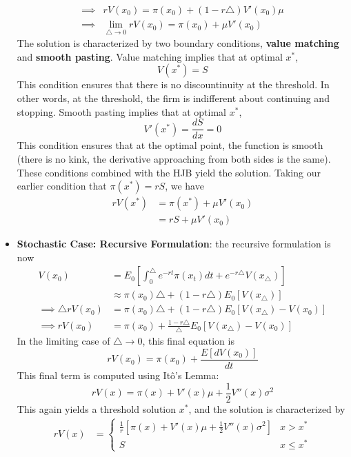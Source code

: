 \documentclass[12pt]{article}
\begin{document}
\begin{itemize}
\[\begin{split}
        \implies &rV(x_0) = \pi(x_0) + (1-r\triangle)V'(x_0)\mu \\
        \implies &\lim_{\triangle \to 0}rV(x_0) = \pi(x_0) + \mu V'(x_0)
    \end{split}\]
    The solution is characterized by two boundary conditions, \textbf{value matching} and \textbf{smooth pasting}. Value matching implies that at optimal $x^*$, 
    \[V(x^*) = S\]
    This condition ensures that there is no discountinuity at the threshold. In other words, at the threshold, the firm is indifferent about continuing and stopping. Smooth pasting implies that at optimal $x^*$,
    \[V'(x^*) = \frac{dS}{dx} = 0\]
    This condition ensures that at the optimal point, the function is smooth (there is no kink, the derivative approaching from both sides is the same). These conditions combined with the HJB yield the solution. Taking our earlier condition that $\pi(x^*) = rS$, we have
    \[\begin{split}
        rV(x^*) &= \pi(x^*) + \mu V'(x_0) \\
        &= rS + \mu V'(x_0)
    \end{split}\]
    \item \textbf{Stochastic Case: Recursive Formulation}: the recursive formulation is now
    \[\begin{split}
        V(x_0) &= E_0\left[\int_0^{\triangle} e^{-rt} \pi(x_t)dt + e^{-r\triangle}V(x_{\triangle})\right] \\
        &\approx \pi(x_0)\triangle + (1-r\triangle)E_0[V(x_{\triangle})] \\
        \implies \triangle rV(x_0) &= \pi(x_0)\triangle + (1-r\triangle)E_0[V(x_{\triangle}) - V(x_0)] \\
        \implies rV(x_0) &= \pi(x_0) + \frac{1-r\triangle}{\triangle}E_0[V(x_{\triangle}) - V(x_0)] 
    \end{split}\]
    In the limiting case of $\triangle \to 0$, this final equation is
    \[rV(x_0) = \pi(x_0) + \frac{E[dV(x_0)]}{dt}\]
    This final term is computed using Itô's Lemma:
    \[rV(x) = \pi(x) + V'(x)\mu + \frac{1}{2}V''(x)\sigma^2\]
    This again yields a threshold solution $x^*$, and the solution is characterized by
    \[\begin{split}
        rV(x) &= \begin{cases}
        \frac{1}{r}\left[\pi(x) + V'(x)\mu + \frac{1}{2}V''(x)\sigma^2\right] & x > x^* \\
        S & x \leq x^*
        \end{cases} \\

\end{split}\]
\end{itemize}
\end{document}
